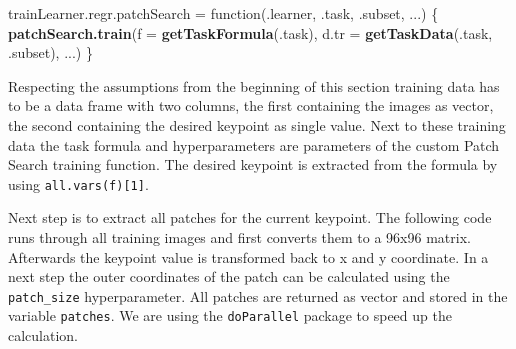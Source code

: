 \documentclass[]{article}
\newenvironment{Shaded}{\begin{snugshade}}{\end{snugshade}}
\newcommand{\KeywordTok}[1]{\textcolor[rgb]{0.13,0.29,0.53}{\textbf{{#1}}}}
\newcommand{\DataTypeTok}[1]{\textcolor[rgb]{0.13,0.29,0.53}{{#1}}}
\newcommand{\DecValTok}[1]{\textcolor[rgb]{0.00,0.00,0.81}{{#1}}}
\newcommand{\CharTok}[1]{\textcolor[rgb]{0.31,0.60,0.02}{{#1}}}
\newcommand{\StringTok}[1]{\textcolor[rgb]{0.31,0.60,0.02}{{#1}}}
\newcommand{\NormalTok}[1]{{#1}}
\begin{document}
\begin{Shaded}
\begin{Highlighting}[]
\NormalTok{trainLearner.regr.patchSearch =}\StringTok{ }\NormalTok{function(.learner, .task, .subset, ...) \{}
  \KeywordTok{patchSearch.train}\NormalTok{(}\DataTypeTok{f =} \KeywordTok{getTaskFormula}\NormalTok{(.task),}
                    \DataTypeTok{d.tr =} \KeywordTok{getTaskData}\NormalTok{(.task, .subset),}
                    \NormalTok{...)}
\NormalTok{\}}
\end{Highlighting}
\end{Shaded}

Respecting the assumptions from the beginning of this section training
data has to be a data frame with two columns, the first containing the
images as vector, the second containing the desired keypoint as single
value. Next to these training data the task formula and hyperparameters
are parameters of the custom Patch Search training function. The desired
keypoint is extracted from the formula by using
\texttt{all.vars(f){[}1{]}}.

\begin{Shaded}
\end{Shaded}

Next step is to extract all patches for the current keypoint. The
following code runs through all training images and first converts them
to a 96x96 matrix. Afterwards the keypoint value is transformed back to
x and y coordinate. In a next step the outer coordinates of the patch
can be calculated using the \texttt{patch\_size} hyperparameter. All
patches are returned as vector and stored in the variable
\texttt{patches}. We are using the \texttt{doParallel} package to speed
up the calculation.
\end{document}

